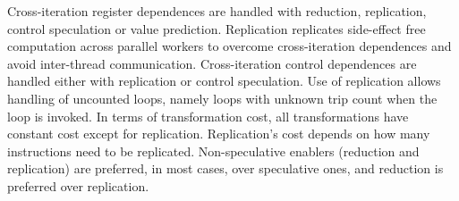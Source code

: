 Cross-iteration register dependences
are handled with reduction, replication, control speculation or value
prediction. Replication replicates side-effect free computation across
parallel workers to overcome cross-iteration dependences and avoid
inter-thread communication.
%
Cross-iteration control dependences are handled either with
replication or control speculation.
Use of replication allows handling of uncounted loops, namely loops
with unknown trip count when the loop is invoked.
%
In terms of transformation cost, all transformations have constant
cost except for replication.  Replication's cost depends on how many
instructions need to be replicated. Non-speculative enablers
(reduction and replication) are preferred, in most cases, over
speculative ones, and reduction is preferred over replication.


%

%
%
%
%
%
%
%
